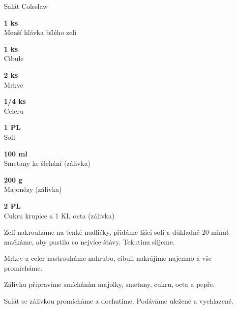 \documentclass[11pt,a4paper]{article}
\begin{document}
\begin{recipe}[DarkSeaGreen]{Salát Coleslaw}
    \begin{ingredients}
        \item \parbox[t]{\linewidth}{\raggedright \piece \textbf{1 ks}\\ Menší hlávka bílého zelí}
        \item \parbox[t]{\linewidth}{\raggedright \piece \textbf{1 ks}\\ Cibule}
        \item \parbox[t]{\linewidth}{\raggedright \piece \textbf{2 ks}\\ Mrkve}
        \item \parbox[t]{\linewidth}{\raggedright \piece \textbf{1/4 ks}\\ Celeru}
        \item \parbox[t]{\linewidth}{\raggedright \spoon \textbf{1 PL}\\ Soli}
        \item \parbox[t]{\linewidth}{\raggedright \liquid \textbf{100 ml}\\ Smetany ke šlehání (zálivka)}
        \item \parbox[t]{\linewidth}{\raggedright \weight \textbf{200 g}\\ Majonézy (zálivka)}
        \item \parbox[t]{\linewidth}{\raggedright \spoon \textbf{2 PL}\\ Cukru krupice a 1 KL octa (zálivka)}
    \end{ingredients}
    \begin{steps}
        \item Zelí nakrouháme na tenké nudličky, přidáme lžíci soli a důkladně 20 minut mačkáme, aby pustilo co nejvíce šťávy. Tekutinu slijeme.
        \item Mrkev a celer nastrouháme nahrubo, cibuli nakrájíme najemno a vše promícháme.
        \item Zálivku připravíme smícháním majolky, smetany, cukru, octa a pepře.
        \item Salát se zálivkou promícháme a dochutíme. Podáváme uležené a vychlazené.
    \end{steps}
\end{recipe}
\end{document}
